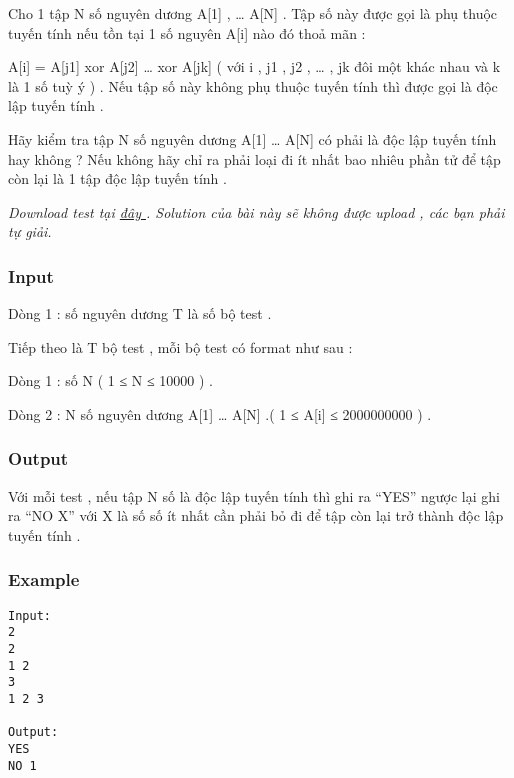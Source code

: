 



   Cho 1 tập N số nguyên dương A[1] , … A[N] . Tập số này được gọi là phụ thuộc tuyến tính nếu tồn tại 1 số nguyên A[i] nào đó thoả mãn :   


   A[i] = A[j1] xor A[j2] … xor A[jk] ( với i , j1 , j2 , … , jk  đôi một khác nhau và k là 1 số tuỳ ý ) . Nếu tập số này không phụ thuộc tuyến tính thì được gọi là độc lập tuyến tính .   


   Hãy kiểm tra tập N số nguyên dương A[1] … A[N] có phải là độc lập tuyến tính hay không ? Nếu không hãy chỉ ra phải loại đi ít nhất bao nhiêu phần tử để tập còn lại là 1 tập độc lập tuyến tính .   





\textit{    Download test tại    \href{http://vn.spoj.pl/content/XOR.rar}{     đây    }    . Solution của bài này sẽ không được upload , các bạn phải tự giải.   }

\subsubsection{   Input  }

   Dòng 1 : số nguyên dương T là số bộ test .   


   Tiếp theo là T bộ test , mỗi bộ test có format như sau :   


   Dòng 1 : số N ( 1 ≤ N ≤ 10000 ) .   


   Dòng 2 : N số nguyên dương A[1] … A[N] .( 1 ≤ A[i] ≤ 2000000000 ) .   




\subsubsection{   Output  }

   Với mỗi test , nếu tập N số là độc lập tuyến tính thì ghi ra “YES” ngược lại ghi ra “NO X” với X là số số ít nhất cần phải bỏ đi để tập còn lại trở thành độc lập tuyến tính .  

\subsubsection{   Example  }
\begin{verbatim}
Input:
2
2
1 2
3
1 2 3

Output:
YES
NO 1
\end{verbatim}
